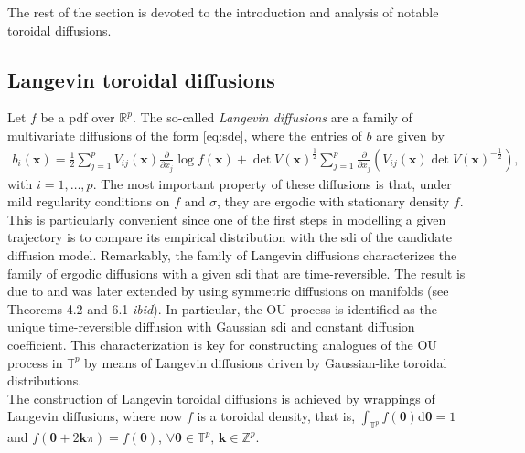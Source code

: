 \documentclass[oneside,11pt]{article}
\newcommand{\R}{\mathbb{R}}
\newcommand{\T}{\mathbb{T}}
\newcommand{\Z}{\mathbb{Z}}
\newcommand{\rd}{\mathrm{d}}
\newcommand{\bx}{\mathbf{x}}
\newcommand{\bk}{\mathbf{k}}
\newcommand{\btheta}{\boldsymbol\theta}
\newcommand{\lrp}[1]{\left(#1\right)}
\newcommand{\pf}[2]{\frac{\partial #1}{\partial #2}}
\begin{document}
The rest of the section is devoted to the introduction and analysis of notable toroidal diffusions.

\subsection{Langevin toroidal diffusions}

Let $f$ be a pdf over $\R^p$. The so-called \textit{Langevin diffusions} are a family of multivariate diffusions of the form \eqref{eq:sde}, where the entries of $b$ are given by
\begin{align}
b_i(\bx)=\frac{1}{2}\sum_{j=1}^pV_{ij}(\bx)\pf{}{x_j}\log f(\bx) +\det V(\bx)^\frac{1}{2}\sum_{j=1}^p\pf{}{x_j}\lrp{V_{ij}(\bx)\det V(\bx)^{-\frac{1}{2}}},\label{eq:lange}
\end{align}
with $i=1,\ldots,p$. The most important property of these diffusions is that, under mild regularity conditions on $f$ and $\sigma$, they are ergodic with stationary density $f$. This is particularly convenient since one of the first steps in modelling a given trajectory is to compare its empirical distribution with the sdi of the candidate diffusion model. Remarkably, the family of Langevin diffusions characterizes the family of ergodic diffusions with a given sdi that are time-reversible. The result is due to \cite{Kolmogoroff1937} and was later extended by \cite{Kent1978} using symmetric diffusions on manifolds (see Theorems 4.2 and 6.1 \textit{ibid}). In particular, the OU process is identified as the unique time-reversible diffusion with Gaussian sdi and constant diffusion coefficient. This characterization is key for constructing analogues of the OU process in $\T^p$ by means of Langevin diffusions driven by Gaussian-like toroidal distributions. \\

The construction of Langevin toroidal diffusions is achieved by wrappings of Langevin diffusions, where now $f$ is a toroidal density, that is, $\int_{\T^p}f(\btheta)\rd\btheta=1$ and $f(\btheta+2\bk\pi)=f(\btheta)$, $\forall\btheta\in\T^p,\,\bk\in\Z^p$.
\end{document}
